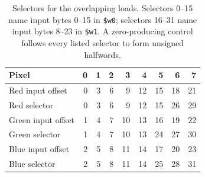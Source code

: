 \begin{table}[htbp]
  \centering\small
  \begin{tabular}{lrrrrrrrr}
    \toprule
    Pixel              & 0 & 1 & 2 & 3  & 4  & 5  & 6  & 7  \\
    \midrule
    Red input offset   & 0 & 3 & 6 & 9  & 12 & 15 & 18 & 21 \\
    Red selector       & 0 & 3 & 6 & 9  & 12 & 15 & 26 & 29 \\
    Green input offset & 1 & 4 & 7 & 10 & 13 & 16 & 19 & 22 \\
    Green selector     & 1 & 4 & 7 & 10 & 13 & 24 & 27 & 30 \\
    Blue input offset  & 2 & 5 & 8 & 11 & 14 & 17 & 20 & 23 \\
    Blue selector      & 2 & 5 & 8 & 11 & 14 & 25 & 28 & 31 \\
    \bottomrule
  \end{tabular}
  \caption{Selectors for the overlapping loads. Selectors 0--15 name input bytes 0--15 in \texttt{\$w0}; selectors 16--31 name input bytes 8--23 in \texttt{\$w1}. A zero-producing control follows every listed selector to form unsigned halfwords.}
  \label{tab:revision-msa-selectors}
\end{table}
